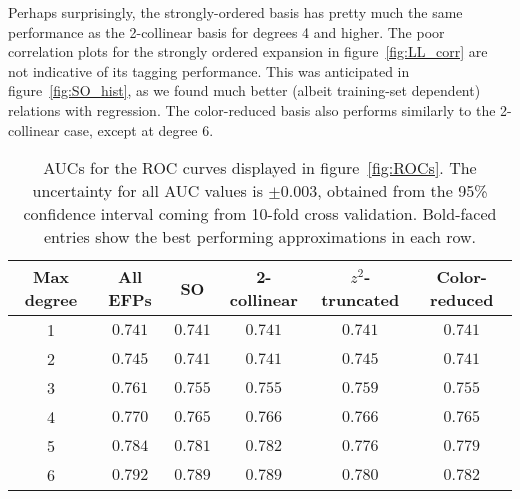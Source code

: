 \documentclass[a4paper,11pt]{article}
\newcommand{\fig}[1]{figure~\ref{fig:#1}}
\begin{document}
Perhaps surprisingly, the strongly-ordered basis has pretty much the same performance as the 2-collinear basis for degrees 4 and higher.
%
The poor correlation plots for the strongly ordered expansion in \fig{LL_corr} are not indicative of its tagging performance.
%
This was anticipated in \fig{SO_hist}, as we found much better (albeit training-set dependent) relations with regression.
%
The color-reduced basis also performs similarly to the 2-collinear case, except at degree 6.

\begin{table}[!t]
\centering
\begin{tabular}{c || c || c | c | c | c }
Max degree & All EFPs                   & SO                            &  2-collinear                &    $z^2$-truncated  &    Color-reduced   \\ \hline \hline
 1                 & $0.741 $   & \boldmath$0.741  $   & \boldmath$0.741  $   &    \boldmath$0.741  $   &    \boldmath $0.741 $   \\ \hline
 2                 & $0.745 $   & $0.741  $   & $0.741  $   &    \boldmath$0.745  $     &   $0.741 $          \\ \hline
 3                 & $0.761 $   & $0.755  $   & $0.755  $   &    \boldmath$0.759  $    &      $0.755 $          \\ \hline
 4                 & $0.770$   & $0.765  $   & \boldmath$0.766  $   &    \boldmath$0.766  $      &     $0.765 $         \\ \hline
 5                 & $0.784  $  & $0.781  $   & \boldmath$0.782  $   &    $0.776  $   &    $0.779 $       \\ \hline
 6                 &  $0.792$   & \boldmath$0.789  $   & \boldmath$0.789  $   &    $0.780  $    &  $0.782 $           \\ 
\end{tabular}

\caption{ AUCs for the ROC curves displayed in \fig{ROCs}. The uncertainty for all AUC values is $\pm 0.003$, obtained from the 95\% confidence interval coming from 10-fold cross validation. Bold-faced entries show the best performing approximations in each row.  \label{tab:AUCs}}
\end{table}
\end{document}
